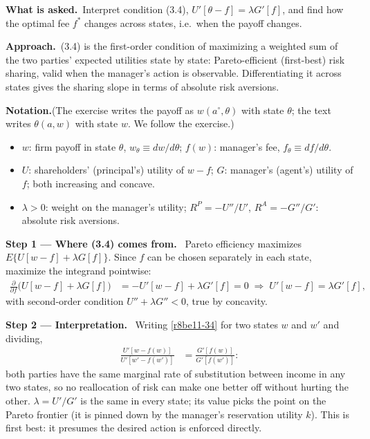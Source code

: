 \documentclass[11pt,a4paper]{article}
\newcommand{\notation}{\par\noindent\textbf{Notation.}}
\newcommand{\step}[2]{\par\medskip\noindent\textbf{Step #1 --- #2.}~}
\newcommand{\asked}{\par\medskip\noindent\textbf{What is asked.}~}
\newcommand{\approach}{\par\smallskip\noindent\textbf{Approach.}~}
\begin{document}
\asked Interpret condition (3.4), $U'[\theta-f]=\lambda G'[f]$, and find how the optimal fee $f^*$ changes across states, i.e.\ when the payoff changes.

\approach (3.4) is the first-order condition of maximizing a weighted sum of the two parties' expected utilities state by state: Pareto-efficient (first-best) risk sharing, valid when the manager's action is observable. Differentiating it across states gives the sharing slope in terms of absolute risk aversions.

\notation (The exercise writes the payoff as $w(a^\circ,\theta)$ with state $\theta$; the text writes $\theta(a,w)$ with state $w$. We follow the exercise.)
\begin{itemize}
  \item $w$: firm payoff in state $\theta$, $w_\theta\equiv dw/d\theta$; $f(w)$: manager's fee, $f_\theta\equiv df/d\theta$.
  \item $U$: shareholders' (principal's) utility of $w-f$; $G$: manager's (agent's) utility of $f$; both increasing and concave.
  \item $\lambda>0$: weight on the manager's utility; $R^P=-U''/U'$, $R^A=-G''/G'$: absolute risk aversions.
\end{itemize}

\step{1}{Where (3.4) comes from} Pareto efficiency maximizes $E\{U[w-f]+\lambda G[f]\}$. Since $f$ can be chosen separately in each state, maximize the integrand pointwise:
\begin{align}
  \frac{\partial}{\partial f}\big(U[w-f]+\lambda G[f]\big) &= -U'[w-f]+\lambda G'[f] = 0 \;\Longrightarrow\; U'[w-f]=\lambda G'[f], \label{r8be11-34}
\end{align}
with second-order condition $U''+\lambda G''<0$, true by concavity.

\step{2}{Interpretation} Writing \eqref{r8be11-34} for two states $w$ and $w'$ and dividing,
\begin{align}
  \frac{U'[w-f(w)]}{U'[w'-f(w')]} &= \frac{G'[f(w)]}{G'[f(w')]}: \label{r8be11-mrs}
\end{align}
both parties have the same marginal rate of substitution between income in any two states, so no reallocation of risk can make one better off without hurting the other. $\lambda=U'/G'$ is the same in every state; its value picks the point on the Pareto frontier (it is pinned down by the manager's reservation utility $k$). This is first best: it presumes the desired action is enforced directly.
\end{document}
